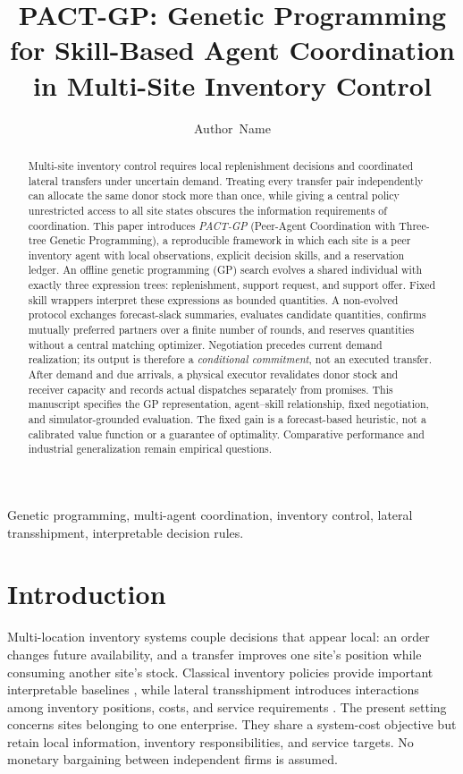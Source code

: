\documentclass[journal]{IEEEtran}
\title{PACT-GP: Genetic Programming for Skill-Based Agent Coordination in Multi-Site Inventory Control}
\author{Author~Name}
\begin{document}
\maketitle

\begin{abstract}
Multi-site inventory control requires local replenishment decisions and
coordinated lateral transfers under uncertain demand. Treating every transfer
pair independently can allocate the same donor stock more than once, while
giving a central policy unrestricted access to all site states obscures the
information requirements of coordination. This paper introduces \emph{PACT-GP}
(Peer-Agent Coordination with Three-tree Genetic Programming), a reproducible
framework in which each site is a peer inventory agent with local observations,
explicit decision skills, and a reservation ledger. An offline genetic
programming (GP) search evolves a shared individual with exactly three
expression trees: replenishment, support request, and support offer. Fixed skill
wrappers interpret these expressions as bounded quantities. A non-evolved
protocol exchanges forecast-slack summaries, evaluates candidate quantities,
confirms mutually preferred partners over a finite number of rounds, and
reserves quantities without a central matching optimizer. Negotiation precedes
current demand realization; its output is therefore a \emph{conditional commitment},
not an executed transfer. After demand and due arrivals, a physical executor
revalidates donor stock and receiver capacity and records actual dispatches
separately from promises. This manuscript specifies the GP representation,
agent--skill relationship, fixed negotiation, and simulator-grounded evaluation.
The fixed gain is a forecast-based heuristic, not a calibrated value function
or a guarantee of optimality. Comparative performance and industrial
generalization remain empirical questions.
\end{abstract}

\begin{IEEEkeywords}
Genetic programming, multi-agent coordination, inventory control, lateral
transshipment, interpretable decision rules.
\end{IEEEkeywords}

\section{Introduction}
Multi-location inventory systems couple decisions that appear local:
an order changes future availability, and a transfer improves one site's
position while consuming another site's stock. Classical inventory policies
provide important interpretable baselines \cite{zipkin2000foundations,axsater2015inventory},
while lateral transshipment introduces interactions among inventory positions,
costs, and service requirements \cite{paterson2011lateral}.
The present setting concerns sites belonging to one enterprise. They share a
system-cost objective but retain local information, inventory responsibilities,
and service targets. No monetary bargaining between independent firms is
assumed.
\end{document}
